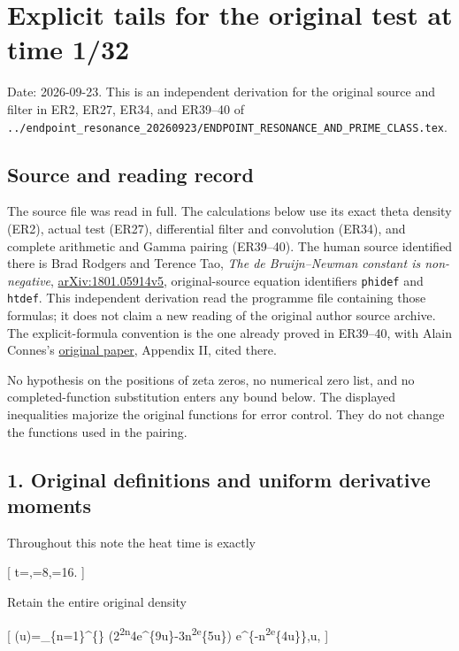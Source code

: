 \documentclass[
]{article}
\author{}
\date{}
\begin{document}
\section{Explicit tails for the original test at time
1/32}\label{explicit-tails-for-the-original-test-at-time-132}

Date: 2026-09-23. This is an independent derivation for the original
source and filter in ER2, ER27, ER34, and ER39--40 of
\texttt{../endpoint\_resonance\_20260923/ENDPOINT\_RESONANCE\_AND\_PRIME\_CLASS.tex}.

\subsection{Source and reading record}\label{source-and-reading-record}

The source file was read in full. The calculations below use its exact
theta density (ER2), actual test (ER27), differential filter and
convolution (ER34), and complete arithmetic and Gamma pairing
(ER39--40). The human source identified there is Brad Rodgers and
Terence Tao, \emph{The de Bruijn--Newman constant is non-negative},
\href{https://arxiv.org/abs/1801.05914v5}{arXiv:1801.05914v5},
original-source equation identifiers \texttt{phidef} and \texttt{htdef}.
This independent derivation read the programme file containing those
formulas; it does not claim a new reading of the original author source
archive. The explicit-formula convention is the one already proved in
ER39--40, with Alain Connes's
\href{https://arxiv.org/abs/math/9811068v1}{original paper}, Appendix
II, cited there.

No hypothesis on the positions of zeta zeros, no numerical zero list,
and no completed-function substitution enters any bound below. The
displayed inequalities majorize the original functions for error
control. They do not change the functions used in the pairing.

\subsection{1. Original definitions and uniform derivative
moments}\label{original-definitions-and-uniform-derivative-moments}

Throughout this note the heat time is exactly

{[} t=,\qquad {}=8,\qquad {}=16. {]}

Retain the entire original density

{[} \Phi(u)=\sum\_\{n=1\}\^{}\{\infty\}
\bigl(2\pi\textsuperscript{2n}4e\^{}\{9u\}-3\pi n\textsuperscript{2e}\{5u\}\bigr)
e\^{}\{-\pi n\textsuperscript{2e}\{4u\}\},\qquad u, {]}
\end{document}
